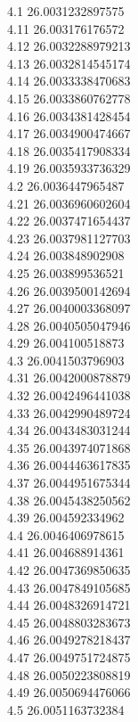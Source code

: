 {4.1	26.0031232897575\\
4.11	26.003176176572\\
4.12	26.0032288979213\\
4.13	26.0032814545174\\
4.14	26.0033338470683\\
4.15	26.0033860762778\\
4.16	26.0034381428454\\
4.17	26.0034900474667\\
4.18	26.0035417908334\\
4.19	26.0035933736329\\
4.2	26.0036447965487\\
4.21	26.0036960602604\\
4.22	26.0037471654437\\
4.23	26.0037981127703\\
4.24	26.003848902908\\
4.25	26.003899536521\\
4.26	26.0039500142694\\
4.27	26.0040003368097\\
4.28	26.0040505047946\\
4.29	26.004100518873\\
4.3	26.0041503796903\\
4.31	26.0042000878879\\
4.32	26.0042496441038\\
4.33	26.0042990489724\\
4.34	26.0043483031244\\
4.35	26.0043974071868\\
4.36	26.0044463617835\\
4.37	26.0044951675344\\
4.38	26.0045438250562\\
4.39	26.004592334962\\
4.4	26.0046406978615\\
4.41	26.004688914361\\
4.42	26.0047369850635\\
4.43	26.0047849105685\\
4.44	26.0048326914721\\
4.45	26.0048803283673\\
4.46	26.0049278218437\\
4.47	26.0049751724875\\
4.48	26.0050223808819\\
4.49	26.0050694476066\\
4.5	26.0051163732384\\
}
